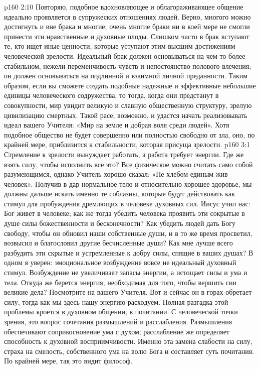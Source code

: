 \vs p160 2:10 \pc Повторяю, подобное вдохновляющее и облагораживающее общение идеально проявляется в супружеских отношениях людей. Верно, многого можно достигнуть и вне брака и многие, очень многие браки ни в коей мере не смогли принести эти нравственные и духовные плоды. Слишком часто в брак вступают те, кто ищет иные ценности, которые уступают этим высшим достижениям человеческой зрелости. Идеальный брак должен основываться на чем\hyp{}то более стабильном, нежели переменчивость чувств и непостоянство полового влечения; он должен основываться на подлинной и взаимной личной преданности. Таким образом, если вы сможете создать подобные надежные и эффективные небольшие единицы человеческого содружества, то тогда, когда они предстанут в совокупности, мир увидит великую и славную общественную структуру, зрелую цивилизацию смертных. Такой расе, возможно, и удастся начать реализовывать идеал вашего Учителя: «Мир на земле и добрая воля среди людей». Хотя подобное общество не будет совершенно или полностью свободно от зла, оно, по крайней мере, приблизится к стабильности, которая присуща зрелости.
\vs p160 3:1 Стремление к зрелости вынуждает работать, а работа требует энергии. Где же взять силу, чтобы исполнить все это? Все физическое можно считать само собой разумеющимся, однако Учитель хорошо сказал: «Не хлебом единым жив человек». Получив в дар нормальное тело и относительно хорошее здоровье, мы должны дальше искать именно те соблазны, которые будут действовать как стимул для пробуждения дремлющих в человеке духовных сил. Иисус учил нас: Бог живет в человеке; как же тогда убедить человека проявить эти сокрытые в душе силы божественности и бесконечности? Как убедить людей дать Богу свободу, чтобы он обновил наши собственные души, и в то же время просветил, возвысил и благословил другие бесчисленные души? Как мне лучше всего разбудить эти скрытые и устремленные к добру силы, спящие в ваших душах? В одном я уверен: эмоциональное возбуждение вовсе не идеальный духовный стимул. Возбуждение не увеличивает запасы энергии, а истощает силы и ума и тела. Откуда же берется энергия, необходимая для того, чтобы вершить сии великие дела? Посмотрите на вашего Учителя. Вот и сейчас он в горах обретает силу, тогда как мы здесь нашу энергию расходуем. Полная разгадка этой проблемы кроется в духовном общении, в почитании. С человеческой точки зрения, это вопрос сочетания размышлений и расслабления. Размышления обеспечивают соприкосновение ума с духом; расслабление же определяет способность к духовной восприимчивости. Именно эта замена слабости на силу, страха на смелость, собственного ума на волю Бога и составляет суть почитания. По крайней мере, так это видит философ.
